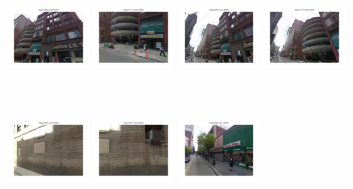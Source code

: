         \begin{minipage}{0.75\linewidth}
            \begin{minipage}{\linewidth} 
                \colorbox{myGreen}{\includegraphics[trim = 35mm 30mm 35mm 30mm, clip=true, height=16mm]{imgs/Pval/exImproved04/improvedPval01.jpg}}
                \colorbox{myGreen}{\includegraphics[trim = 35mm 30mm 35mm 30mm, clip=true, height=16mm]{imgs/Pval/exImproved04/improvedPval02.jpg}}
                \colorbox{myGreen}{\includegraphics[trim = 35mm 30mm 35mm 30mm, clip=true, height=16mm]{imgs/Pval/exImproved04/improvedPval03.jpg}}
                \colorbox{myGreen}{\includegraphics[trim = 35mm 30mm 35mm 30mm, clip=true, height=16mm]{imgs/Pval/exImproved04/improvedPval04.jpg}}
            \end{minipage}
            \\
            \begin{minipage}{\linewidth}
                \colorbox{myRed}{\includegraphics[trim = 35mm 30mm 35mm 30mm, clip=true, height=16mm]{imgs/Pval/exImproved04/improved01.jpg}}
                \colorbox{myRed}{\includegraphics[trim = 35mm 30mm 35mm 30mm, clip=true, height=16mm]{imgs/Pval/exImproved04/improved02.jpg}}
                \colorbox{myRed}{\includegraphics[trim = 35mm 30mm 35mm 30mm, clip=true, height=16mm]{imgs/Pval/exImproved04/improved03.jpg}}

\end{minipage}
\end{minipage}
